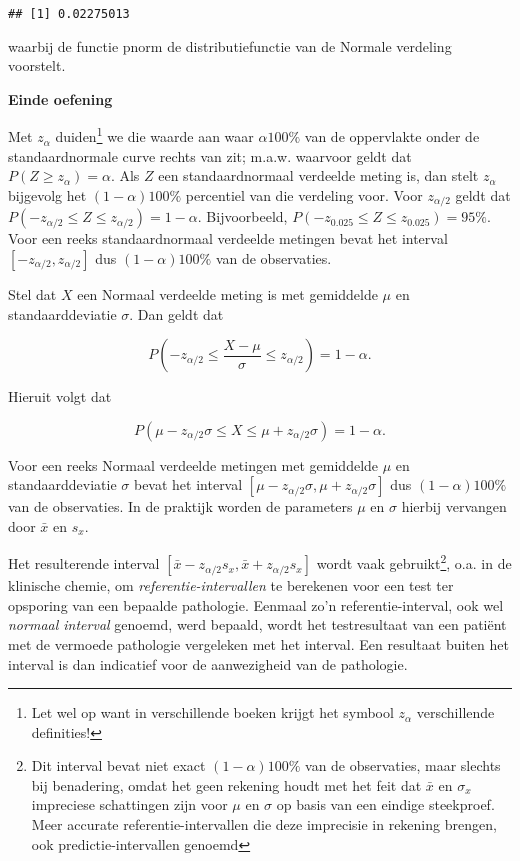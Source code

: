 \documentclass[
  12pt,dutch,coursenotes]{book}
\theoremstyle{definition}
\theoremstyle{definition}
\theoremstyle{definition}
\theoremstyle{remark}
\begin{document}
\begin{verbatim}
## [1] 0.02275013
\end{verbatim}

waarbij de functie pnorm de distributiefunctie van de Normale verdeling voorstelt.

\textbf{Einde oefening}

Met \(z_{\alpha}\) duiden\footnote{Let wel op want in verschillende boeken krijgt het symbool \(z_{\alpha}\) verschillende definities!} we die waarde aan waar \(\alpha100\%\) van de
oppervlakte onder de standaardnormale curve rechts van zit; m.a.w. waarvoor
geldt dat \(P(Z \geq z_{\alpha}) = \alpha\). Als \(Z\) een standaardnormaal
verdeelde meting is, dan stelt \(z_{\alpha}\) bijgevolg het \((1-\alpha)100\%\)
percentiel van die verdeling voor. Voor \(z_{\alpha/2}\) geldt dat \(P(-z_{\alpha/2}\leq Z \leq z_{\alpha/2}) = 1-\alpha\). Bijvoorbeeld, \(P( - z_{0.025}\leq Z \leq z_{0.025}) = 95\%\). Voor een reeks standaardnormaal
verdeelde metingen bevat het interval \([-z_{\alpha/2},z_{\alpha/2}]\) dus \((1-\alpha)100\%\) van de observaties.

Stel dat \(X\) een Normaal verdeelde meting is met gemiddelde \(\mu\) en
standaarddeviatie \(\sigma\). Dan geldt dat

\begin{equation*}
P\left( - z_{\alpha/2}\leq \frac{X - \mu}{\sigma} \leq z_{\alpha/2}\right) =
1-\alpha .
\end{equation*}

Hieruit volgt dat

\begin{equation*}
P( \mu - z_{\alpha/2} \sigma \leq X \leq \mu + z_{\alpha/2} \sigma ) =
1-\alpha .
\end{equation*}

Voor een reeks Normaal verdeelde metingen met gemiddelde \(\mu\) en
standaarddeviatie \(\sigma\) bevat het interval \([\mu-z_{\alpha/2}\sigma,\mu+z_{\alpha/2}\sigma]\) dus \((1-\alpha)100\%\) van de observaties. In de
praktijk worden de parameters \(\mu\) en \(\sigma\) hierbij vervangen door \(\bar x\) en \(s_x\).

Het resulterende interval \([\bar x-z_{\alpha/2}s_x,\bar x+z_{\alpha/2}s_x]\)
wordt vaak gebruikt\footnote{Dit interval bevat niet exact \((1-\alpha)100\%\) van de observaties, maar slechts bij benadering, omdat het geen rekening houdt met het feit dat \(\bar x\) en \(\sigma_x\) impreciese schattingen zijn voor \(\mu\) en \(\sigma\) op basis van een eindige steekproef. Meer accurate referentie-intervallen die deze imprecisie in rekening brengen, ook predictie-intervallen genoemd}, o.a. in de klinische chemie, om \emph{referentie-intervallen} te berekenen voor een test ter opsporing van een
bepaalde pathologie. Eenmaal zo'n referentie-interval, ook wel \emph{normaal interval} genoemd, werd bepaald, wordt het testresultaat van een
patiënt met de vermoede pathologie vergeleken met het interval. Een
resultaat buiten het interval is dan indicatief voor de aanwezigheid van de
pathologie.
\end{document}
